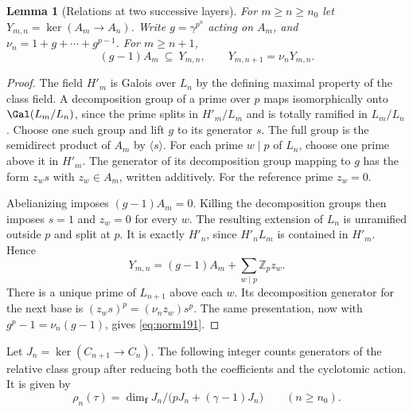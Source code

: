 \documentclass[a4paper,11pt]{article}
\newtheorem{lemma}[proposition]{Lemma}
\theoremstyle{definition}
\theoremstyle{remark}
\newcommand{\ZZ}{\mathbb Z}\newcommand{\ord}{\operatorname{ord}}
\numberwithin{equation}{section}
\begin{document}
\begin{lemma}[Relations at two successive layers]\label{lem:norm191}
For \(m\ge n\ge n_0\) let \(Y_{m,n}=\ker(A_m\to A_n)\).
Write \(g=\gamma^{p^n}\) acting on \(A_m\), and
\(\nu_n=1+g+\cdots+g^{p-1}\). For \(m\ge n+1\),
\begin{equation}
       (g-1)A_m\ \subseteq\ Y_{m,n},\qquad
       Y_{m,n+1}=\nu_n Y_{m,n}.
 \label{eq:norm191}
\end{equation}
\end{lemma}
\begin{proof}
The field \(H'_m\) is Galois over \(L_n\) by the defining maximal
property of the class field. A decomposition group of a prime over
\(p\) maps isomorphically onto \(\Gal(L_m/L_n)\), since the prime
splits in \(H'_m/L_m\) and is totally ramified in \(L_m/L_n\).
Choose one such group and lift \(g\) to its generator \(s\).
The full group is the semidirect product of \(A_m\) by
\(\langle s\rangle\). For each prime \(w\mid p\) of \(L_n\),
choose one prime above it in \(H'_m\). The generator of its
decomposition group mapping to \(g\) has the form \(z_w s\)
with \(z_w\in A_m\), written additively. For the reference
prime \(z_w=0\).

Abelianizing imposes \((g-1)A_m=0\). Killing the decomposition
groups then imposes \(s=1\) and \(z_w=0\) for every \(w\).
The resulting extension of \(L_n\) is unramified outside \(p\)
and split at \(p\). It is exactly \(H'_n\), since \(H'_nL_m\)
is contained in \(H'_m\). Hence
\[
      Y_{m,n}=(g-1)A_m+\sum_{w\mid p}\ZZ_p z_w .
\]
There is a unique prime of \(L_{n+1}\) above each \(w\).
Its decomposition generator for the next base is
\((z_ws)^p=(\nu_n z_w)s^p\). The same presentation, now with
\(g^p-1=\nu_n(g-1)\), gives \eqref{eq:norm191}.
\end{proof}

Let \(J_n=\ker(C_{n+1}\to C_n)\). The following integer counts
generators of the relative class group after reducing both the
coefficients and the cyclotomic action. It is given by
\[
       \rho_n(\tau)=
       \dim_{\mathbf f} J_n/\big(pJ_n+(\gamma-1)J_n\big)
            \qquad(n\ge n_0).
\]
\end{document}
